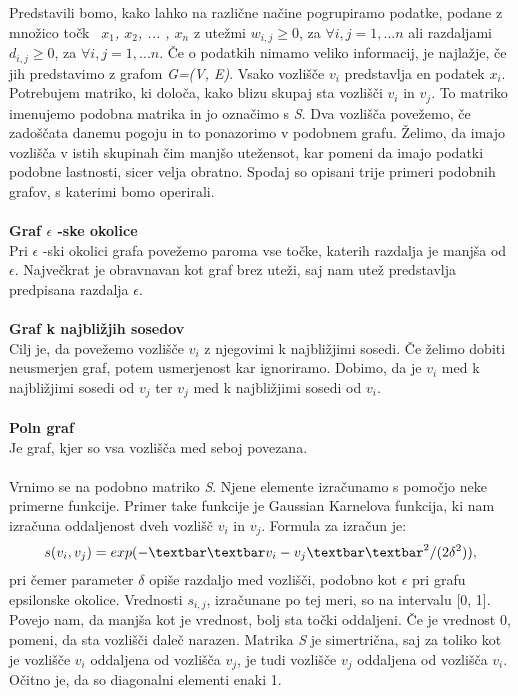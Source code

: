 \documentclass[a4paper, 10pt]{article}
\begin{document}
Predstavili bomo, kako lahko na različne načine pogrupiramo podatke, podane z množico točk \textsl{\ $x_1$, $x_2$, ... , $x_n$ } z utežmi $w_{i,j} \geq 0$, za $\forall i,j = 1, ... n$ ali razdaljami $d_{i,j} \geq 0$, za $\forall i,j = 1, ... n$. Če o podatkih nimamo veliko informacij, je najlažje, če jih predstavimo z grafom \textsl{G=(V, E)}. Vsako vozlišče $v_i$ predstavlja en podatek \textsl{$x_i$}. Potrebujem matriko, ki določa, kako blizu skupaj sta vozlišči $v_i$ in $v_j$. To matriko imenujemo podobna matrika in jo označimo s \textsl{S}. Dva vozlišča povežemo, če zadoščata danemu pogoju in to ponazorimo v podobnem grafu. Želimo, da imajo vozlišča v istih skupinah čim manjšo utežensot, kar pomeni da imajo podatki podobne lastnosti, sicer velja obratno. Spodaj so opisani trije primeri podobnih grafov, s katerimi bomo operirali.\\
\\
\textbf{Graf $\epsilon$ -ske okolice}\\
Pri $\epsilon$ -ski okolici grafa povežemo paroma vse točke, katerih razdalja je manjša od $\epsilon$. Največkrat je obravnavan kot graf brez uteži, saj nam utež predstavlja predpisana razdalja $\epsilon$.\\
\\
\textbf{Graf k najbližjih sosedov}\\
Cilj je, da povežemo vozlišče $v_i$ z njegovimi k najbližjimi sosedi. Če želimo dobiti neusmerjen graf, potem usmerjenost kar ignoriramo. Dobimo, da je $v_i$ med k najbližjimi sosedi od $v_j$ ter $v_j$ med k najbližjimi sosedi od $v_i$.\\
\\
\textbf{Poln graf}\\
Je graf, kjer so vsa vozlišča med seboj povezana.\\
\\
Vrnimo se na podobno matriko \textsl{S}. Njene elemente izračunamo s pomočjo neke primerne funkcije. Primer take funkcije je Gaussian Karnelova funkcija, ki nam izračuna oddaljenost dveh vozlišč $v_i$ in $v_j$. Formula za izračun je:$$s(v_i, v_j) = exp(-\textbar\textbar v_i - v_j \textbar\textbar^2 / (2\delta^2)),$$pri čemer parameter $\delta$ opiše razdaljo med vozlišči, podobno kot $\epsilon$ pri grafu epsilonske okolice.  Vrednosti $s_{i,j}$, izračunane po tej meri, so na intervalu [0, 1]. Povejo nam, da manjša kot je vrednost, bolj sta točki oddaljeni. Če je vrednost 0, pomeni, da sta vozlišči daleč narazen. Matrika \textsl{S} je simertrična, saj za toliko kot je vozlišče $v_i$ oddaljena od vozlišča $v_j$, je tudi vozlišče $v_j$ oddaljena od vozlišča $v_i$. Očitno je, da so diagonalni elementi enaki 1.\\
\end{document}
